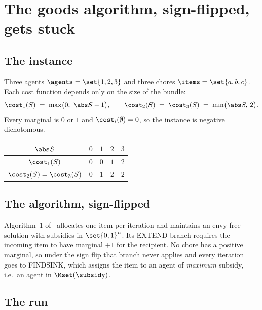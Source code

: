 
\section{The goods algorithm, sign-flipped, gets stuck}
\label{sec:whynotbkns}

\subsection{The instance}

Three agents $\agents = \set{1,2,3}$ and three chores $\items = \set{a,b,c}$.
Each cost function depends only on the size of the bundle:
\[
  \cost_1(S) \;=\; \max\bigl(0,\ \abs S - 1\bigr),
  \qquad
  \cost_2(S) \;=\; \cost_3(S) \;=\; \min\bigl(\abs S,\,2\bigr).
\]
Every marginal is $0$ or $1$ and $\cost_i(\emptyset) = 0$, so the instance is
negative dichotomous.

\begin{center}
\begin{tabular}{c|cccc}
$\abs S$ & $0$ & $1$ & $2$ & $3$ \\
\hline
$\cost_1(S)$ & $0$ & $0$ & $1$ & $2$ \\
$\cost_2(S) = \cost_3(S)$ & $0$ & $1$ & $2$ & $2$ \\
\end{tabular}
\end{center}

\subsection{The algorithm, sign-flipped}

Algorithm~1 of~\cite{BKNS22} allocates one item per iteration and maintains an
envy-free solution with subsidies in $\set{0,1}^n$. Its EXTEND branch requires
the incoming item to have marginal $+1$ for the recipient. No chore has a
positive marginal, so under the sign flip that branch never applies and every
iteration goes to FINDSINK, which assigns the item to an agent of
\emph{maximum} subsidy, i.e.\ an agent in $\Mset(\subsidy)$.

\subsection{The run}

